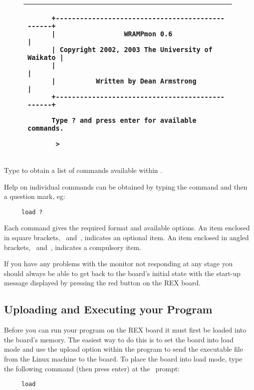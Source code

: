 \begin{figure}[hbp]
\begin{center}
\begin{tabular}{|p{15cm}|}
\hline
\begin{verbatim}
      +------------------------------------------------+
      |                 WRAMPmon 0.6                   |
      | Copyright 2002, 2003 The University of Waikato |
      |                                                |
      |          Written by Dean Armstrong             |
      +------------------------------------------------+
      
      Type ? and press enter for available commands.
      
       > 
\end{verbatim}
\\
\hline
\end{tabular}
\end{center}

\caption{\WRAMPmon}
\label{wrampmon}
\end{figure}

Type  to obtain a list of commands available within \WRAMPmon.

Help on individual commands can be obtained by typing the command and then a 
question mark, eg:
\begin{verbatim}
     load ?
\end{verbatim}

Each command gives the required format and available options.
An item enclosed in square brackets, \src{[}~and~\src{]},
indicates an optional item. An item enclosed in angled brackets, 
\src{<}~and~\src{>}, indicates a compulsory item.

If you have any problems with the monitor not responding at any stage you 
should always be able to get back to
the board's initial state with the start-up message displayed by pressing the 
red  button on the REX board.

\subsection{Uploading and Executing your Program}
Before you can run your program on the REX board it must first be loaded into 
the board's memory. The easiest
way to do this is to set the board into load mode and use the upload option 
within the  program to send
the executable file from the Linux machine to the board. To place the board 
into load mode, type the following
command (then press enter) at the \WRAMPmon\ prompt:
\begin{verbatim}
     load
\end{verbatim}

